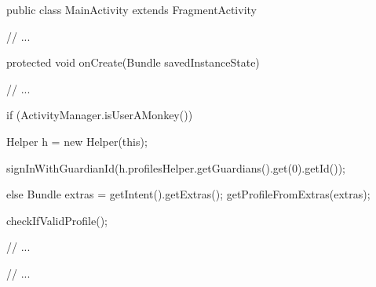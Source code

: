 \begin{javacode}[caption=User manager MainActivity with monkey test,label=lst:main_activity_monkey_test]
public class MainActivity extends FragmentActivity {
  // ...

  protected void onCreate(Bundle savedInstanceState) {
    // ...

    if (ActivityManager.isUserAMonkey()) {
      Helper h = new Helper(this);
      
      signInWithGuardianId(h.profilesHelper.getGuardians().get(0).getId());
    }
    else {
      Bundle extras = getIntent().getExtras();
      getProfileFromExtras(extras);
    }
    
    checkIfValidProfile();

    // ...
    }

  // ...
}
\end{javacode}
